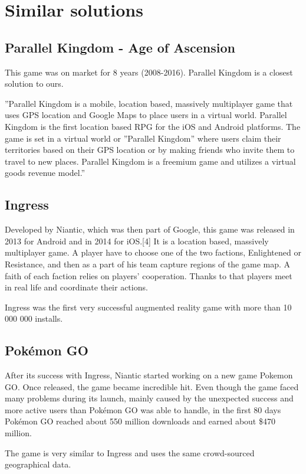 
\section{Similar solutions}

	\subsection{Parallel Kingdom - Age of Ascension}
	This game was on market for 8 years (2008-2016). Parallel Kingdom is a closest solution to ours.
	
	
	”Parallel Kingdom is a mobile, location based, massively multiplayer game that uses GPS
	location and Google Maps to place users in a virtual world. Parallel Kingdom is the first
	location based RPG for the iOS and Android platforms. The game is set in a virtual world
	or ”Parallel Kingdom” where users claim their territories based on their GPS location or by making friends who invite them to travel to new places. Parallel Kingdom is a freemium
	game and utilizes a virtual goods revenue model.”
	
	\subsection{Ingress}
	Developed by Niantic, which was then part of Google, this game was released in 2013 for
	Android and in 2014 for iOS.[4] It is a location based, massively multiplayer game. A player have to choose one of the two factions, Enlightened or Resistance, and then as a part of his 	team capture regions of the game map. A faith of each faction relies on players’ cooperation. Thanks to that players meet in real life and coordinate their actions.
	
	Ingress was the first very successful augmented reality game with more than 10 000 000
	installs.
	
	\subsection{Pokémon GO}
	After its success with Ingress, Niantic started working on a new game Pokemon GO. Once
	released, the game became incredible hit. Even though the game faced many problems during
	its launch, mainly caused by the unexpected success and more active users than Pokémon
	GO was able to handle, in the first 80 days Pokémon GO reached about 550 million downloads and earned about \$470 million.
	
	The game is very similar to Ingress and uses the same crowd-sourced geographical data.
	
